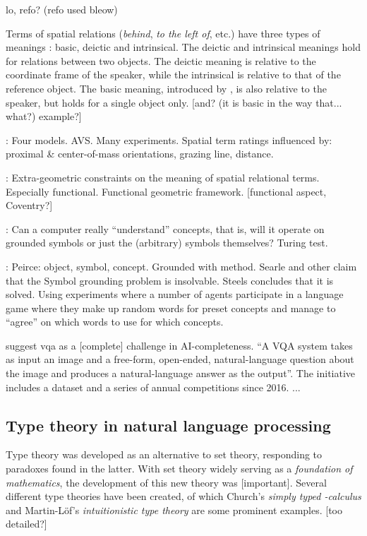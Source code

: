 lo, refo? (refo used bleow)

Terms of spatial relations (\textit{behind}, \textit{to the left of}, etc.) have three types of meanings \citep{Garnhamunifiedtheorymeaning1989}: basic, deictic and intrinsical.
The deictic and intrinsical meanings hold for relations between two objects.
The deictic meaning is relative to the coordinate frame of the speaker, while the intrinsical is relative to that of the reference object.
The basic meaning, introduced by \cite{Garnhamunifiedtheorymeaning1989}, is also relative to the speaker, but holds for a single object only.
[and? (it is basic in the way that... what?) example?]

\cite{RegierGroundingspatiallanguage2001a}:
Four models. AVS.
Many experiments.
Spatial term ratings influenced by: proximal \& center-of-mass orientations, grazing line, distance.

\cite{CoventryClassificationExtrageometricInfluences2004}:
Extra-geometric constraints on the meaning of spatial relational terms.
Especially functional.
Functional geometric framework.
[functional aspect, Coventry?]

\cite{HarnadSymbolGroundingProblem1990}:
Can a computer really ``understand'' concepts, that is, will it operate on grounded symbols or just the (arbitrary) symbols themselves?
Turing test.

\cite{SteelsSymbolGroundingProblem2007}:
Peirce: object, symbol, concept. Grounded with method.
Searle and other claim that the Symbol grounding problem is insolvable.
Steels concludes that it is solved.
Using experiments where a number of agents participate in a language game where they make up random words for preset concepts and manage to ``agree'' on which words to use for which concepts.

\cite{AgrawalVQAVisualQuestion2015} suggest \acrfull{vqa} as a [complete] challenge in AI-completeness.
``A VQA system takes as input an image and a free-form, open-ended, natural-language question about the image and produces a natural-language answer as the output''.
The initiative includes a dataset and a series of annual competitions since 2016.
...



\subsection{Type theory in natural language processing}

Type theory was developed as an alternative to set theory, responding to paradoxes found in the latter.
With set theory widely serving as a \textit{foundation of mathematics}, the development of this new theory was [important].
Several different type theories have been created, of which Church's \textit{simply typed \textlambda-calculus} \cite{church40} and Martin-Löf's \textit{intuitionistic type theory} \citep{martinlof84} are some prominent examples.
\citep{CoquandTypeTheory2015} [too detailed?]

